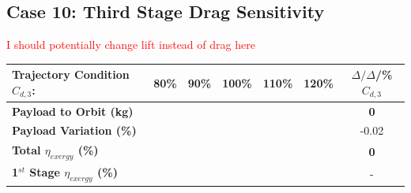 \subsection{Case 10: Third Stage Drag Sensitivity}
\textcolor{red}{I should potentially change lift instead of drag here}
\begin{table}[ht]
	\centering
	\begin{tabular}{l c c c c c c} 
		\hline \textbf{Trajectory Condition}   \qquad  $C_{d,3}$:
		&80\%
		&90\%
		&100\%
		&110\%
		&120\%
		& $\Delta/\Delta$/\%$C_{d,3}$
		\\
		\hline \textbf{Payload to Orbit (kg)}
		& \textbf{\PayloadToOrbitCdThreeEightyNoReturn}
		& \textbf{\PayloadToOrbitCdThreeNinetyNoReturn}
		& \textbf{\PayloadToOrbitCdThreeStandardNoReturn}
		& \textbf{\PayloadToOrbitCdThreeOneHundredTenNoReturn}
		& \textbf{\PayloadToOrbitCdThreeOneHundredTwentyNoReturn}
		&\textbf{0}
		\\
		\textbf{Payload Variation (\%)}
		& \PayloadVarCdThreeEightyNoReturn
		& \PayloadVarCdThreeNinetyNoReturn
		& \PayloadVarCdThreeStandardNoReturn
		& \PayloadVarCdThreeOneHundredTenNoReturn
		& \PayloadVarCdThreeOneHundredTwentyNoReturn
		&-0.02
		\\
		\textbf{Total $\eta_{exergy}$ (\%)}
		& \textbf{\totalExergyEffCdThreeEightyNoReturn}
		& \textbf{\totalExergyEffCdThreeNinetyNoReturn}
		& \textbf{\totalExergyEffCdThreeStandardNoReturn}
		& \textbf{\totalExergyEffCdThreeOneHundredTenNoReturn}
		& \textbf{\totalExergyEffCdThreeOneHundredTwentyNoReturn}
		& \textbf{0}
		\\
		\hline 
		\textbf{1$^{st}$ Stage $\eta_{exergy}$ (\%)}
		& \textbf{\firstExergyEffCdThreeEightyNoReturn}
		& \textbf{\firstExergyEffCdThreeNinetyNoReturn}
		& \textbf{\firstExergyEffCdThreeStandardNoReturn}
		& \textbf{\firstExergyEffCdThreeOneHundredTenNoReturn}
		& \textbf{\firstExergyEffCdThreeOneHundredTwentyNoReturn}
		& -
		\\
	

\end{tabular}
\end{table}
